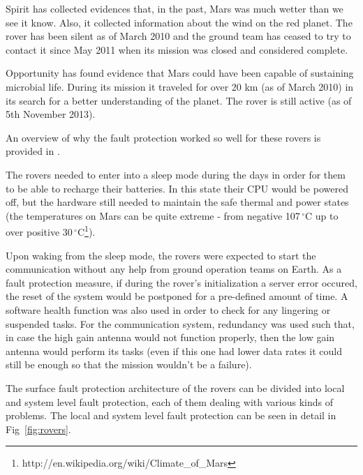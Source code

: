 Spirit has collected evidences that, in the past, Mars was much wetter than we
see it know. Also, it collected information about the wind on the red planet.
The rover has been silent as of March 2010 and the ground team has ceased to try
to contact it since May 2011 when its mission was closed and considered
complete.

Opportunity has found evidence that Mars could have been capable of sustaining
microbial life. During its mission it traveled for over 20 km (as of March 2010)
in its search for a better understanding of the planet. The rover is still
active (as of 5th November 2013).

An overview of why the fault protection worked so well for these rovers is
provided in \cite{surv-nasa-mars}.

The rovers needed to enter into a sleep mode during the days in order for them
to be able to recharge their batteries. In this state their CPU would be powered
off, but the hardware still needed to maintain the safe thermal and power states
(the temperatures on Mars can be quite extreme - from negative
107$\,^{\circ}\mathrm{C}$ up to over positive
30$\,^{\circ}\mathrm{C}$\footnote{http://en.wikipedia.org/wiki/Climate\_of\_Mars}).

Upon waking from the sleep mode, the rovers were expected to start the
communication without any help from ground operation teams on Earth. As a fault
protection measure, if during the rover's initialization a server error occured,
the reset of the system would be postponed for a pre-defined amount of time. A
software health function was also used in order to check for any lingering or
suspended tasks. For the communication system, redundancy was used such that, in
case the high gain antenna would not function properly, then the low gain
antenna would perform its tasks (even if this one had lower data rates it could
still be enough so that the mission wouldn't be a failure).

The surface fault protection architecture of the rovers can be divided into
local and system level fault protection, each of them dealing with various kinds of
problems. The local and system level fault protection can be seen in detail in
Fig~\ref{fig:rovers}.
\cite{fprot}

